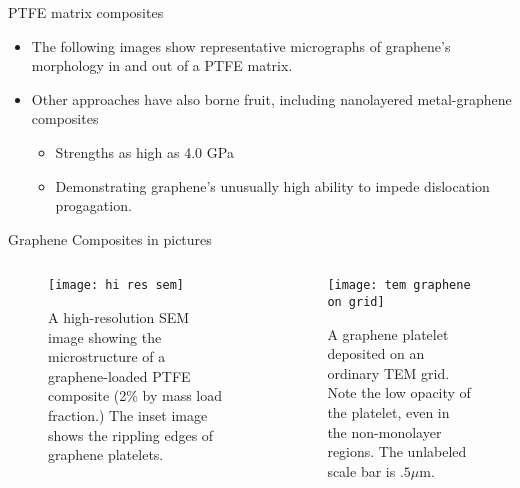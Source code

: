 \documentclass[12pt,letterpaper]{beamer}
\begin{document}
\begin{frame}{PTFE matrix composites}
\begin{itemize}
\item The following images show representative micrographs of graphene's morphology in and out of a PTFE matrix. 
\item Other approaches have also borne fruit, including nanolayered metal-graphene composites
\begin{itemize}
\item Strengths as high as 4.0 GPa
\item Demonstrating graphene's unusually high ability to impede dislocation progagation. \cite{kim2013strengthening}
\end{itemize} 
\end{itemize}
\end{frame}

\begin{frame}{Graphene Composites in pictures}
  \begin{columns}[T]
      \begin{column}{.5\textwidth}
    \begin{block}{}
        \begin{figure}
                \texttt{[image: hi res sem]}
                \caption{A high-resolution SEM image showing the microstructure of a graphene-loaded PTFE composite (2\% by mass load fraction.) The inset image shows the rippling edges of graphene platelets.}
                \label{fig:hi_res_sem}
        \end{figure}
        \end{block}
    \end{column}
    \begin{column}{.5\textwidth}
     \begin{block}{}
        \begin{figure}
                \texttt{[image: tem graphene on grid]}
                \caption{A graphene platelet deposited on an ordinary TEM grid. Note the low opacity of the platelet, even in the non-monolayer regions. The unlabeled scale bar is $.5 \mu$m.}
                \label{fig:graphene_on_grid}
        \end{figure}
    \end{block}
    \end{column}
  \end{columns}
\end{frame}
\end{document}
